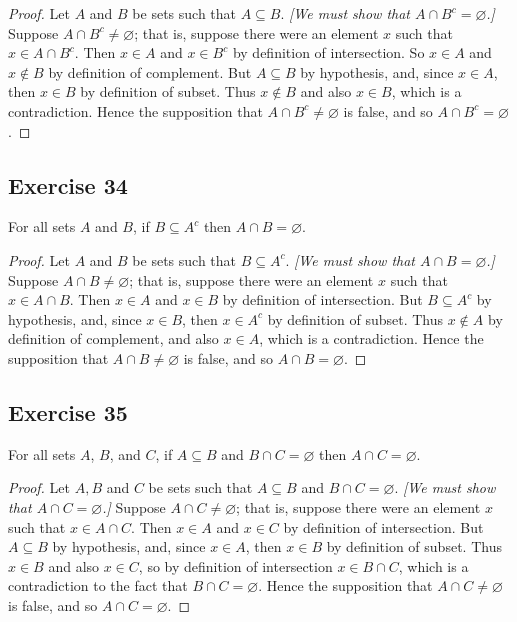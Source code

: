 \documentclass[14pt]{extarticle}
\newcommand{\es}{\varnothing}
\begin{document}
\begin{proof}
  Let $A$ and $B$ be sets such that \(A \subseteq B\). {\it [We must show that \(A \cap B^c = \es\).]} Suppose \(A \cap
  B^c \neq \es\); that is, suppose there were an element $x$ such that \(x \in A \cap B^c\). Then \(x \in A\) and
  \(x \in B^c\) by definition of intersection. So \(x \in A\) and \(x \notin B\) by definition of complement. But
  \(A \subseteq B\) by hypothesis, and, since \(x \in A\), then \(x \in B\) by definition of subset. Thus
  \(x \notin B\) and also \(x \in B\), which is a contradiction. Hence the supposition that \(A \cap B^c \neq
  \es\) is false, and so \(A \cap B^c = \es\).
\end{proof}

\subsection{Exercise 34}
For all sets $A$ and $B$, if \(B \subseteq A^c\) then \(A \cap B = \es\).

\begin{proof}
  Let $A$ and $B$ be sets such that \(B \subseteq A^c\). {\it [We must show that \(A \cap B = \es\).]} Suppose \(A \cap B
  \neq \es\); that is, suppose there were an element $x$ such that \(x \in A \cap B\). Then \(x \in A\) and \(x \in B\)
  by definition of intersection. But \(B \subseteq A^c\) by hypothesis, and, since \(x \in B\), then \(x \in A^c\) by
  definition of subset. Thus \(x \notin A\) by definition of complement, and also \(x \in A\), which is a contradiction.
  Hence the supposition that \(A \cap B \neq \es\) is false, and so \(A \cap B = \es\).
\end{proof}

\subsection{Exercise 35}
For all sets $A$, $B$, and $C$, if \(A \subseteq B\) and \(B \cap C = \es\) then \(A \cap C = \es\).

\begin{proof}
  Let $A,B$ and $C$ be sets such that \(A \subseteq B\) and \(B \cap C = \es\). {\it [We must show that \(A \cap C =
        \es\).]} Suppose \(A \cap C \neq \es\); that is, suppose there were an element $x$ such that \(x \in A \cap C\).
  Then \(x \in A\) and \(x \in C\) by definition of intersection. But \(A \subseteq B\) by hypothesis, and,
  since \(x \in A\), then \(x \in B\) by definition of subset. Thus \(x \in B\) and also \(x \in C\), so by
  definition of intersection \(x \in B \cap C\), which is a contradiction to the fact that \(B \cap C = \es\). Hence
  the supposition that \(A \cap C \neq \es\) is false, and so \(A \cap C = \es\).
\end{proof}
\end{document}
